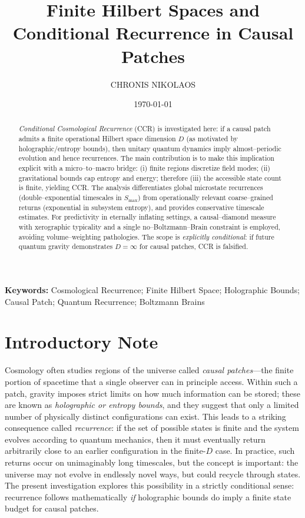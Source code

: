 \documentclass[12pt]{article}
\title{Finite Hilbert Spaces and Conditional Recurrence in Causal Patches}
\author{CHRONIS NIKOLAOS}
\affil[1]{Department of Computer Science \& Engineering, University of Crete}
\date{\today}
\newcommand{\Smax}{S_{\max}}
\theoremstyle{remark}
\begin{document}
\maketitle

\begin{abstract}
\emph{Conditional Cosmological Recurrence} (CCR) is investigated here: if a causal patch admits a finite operational Hilbert space dimension $D$ (as motivated by holographic/entropy bounds), then unitary quantum dynamics imply almost–periodic evolution and hence recurrences. 
The main contribution is to make this implication explicit with a micro–to–macro bridge: (i) finite regions discretize field modes; (ii) gravitational bounds cap entropy and energy; therefore (iii) the accessible state count is finite, yielding CCR. 
The analysis differentiates global microstate recurrences (double–exponential timescales in $\Smax$) from operationally relevant coarse–grained returns (exponential in subsystem entropy), and provides conservative timescale estimates. 
For predictivity in eternally inflating settings, a causal–diamond measure with xerographic typicality and a single no–Boltzmann–Brain constraint is employed, avoiding volume–weighting pathologies. 
The scope is \emph{explicitly conditional}: if future quantum gravity demonstrates $D=\infty$ for causal patches, CCR is falsified.
\end{abstract}


\noindent\textbf{Keywords:} 
Cosmological Recurrence; Finite Hilbert Space; Holographic Bounds; 
Causal Patch; Quantum Recurrence; Boltzmann Brains


\section*{Introductory Note}

Cosmology often studies regions of the universe called \emph{causal patches}---the finite
portion of spacetime that a single observer can in principle access. Within such a patch,
gravity imposes strict limits on how much information can be stored; these are known as
\emph{holographic or entropy bounds}, and they suggest that only a limited number of
physically distinct configurations can exist. This leads to a striking consequence called
\emph{recurrence}: if the set of possible states is finite and the system evolves according to
quantum mechanics, then it must eventually return arbitrarily close to an earlier
configuration in the finite-$D$ case. In practice, such returns occur on unimaginably long timescales, but the
concept is important: the universe may not evolve in endlessly novel ways, but could recycle
through states. The present investigation explores this possibility in a strictly conditional sense:
recurrence follows mathematically \emph{if} holographic bounds do imply a finite state
budget for causal patches.
\end{document}
